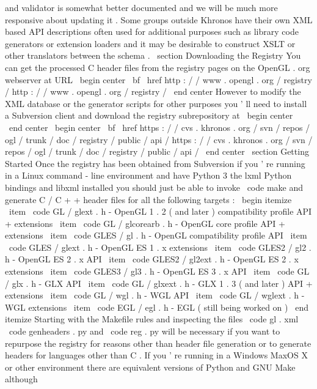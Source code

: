 and
validator
is
somewhat
better
documented
and
we
will
be
much
more
responsive
about
updating
it
.
Some
groups
outside
Khronos
have
their
own
XML
based
API
descriptions
often
used
for
additional
purposes
such
as
library
code
generators
or
extension
loaders
and
it
may
be
desirable
to
construct
XSLT
or
other
translators
between
the
schema
.
\
section
{
Downloading
the
Registry
}
You
can
get
the
processed
C
header
files
from
the
registry
pages
on
the
OpenGL
.
org
webserver
at
URL
\
begin
{
center
}
{
\
bf
\
href
{
http
:
/
/
www
.
opengl
.
org
/
registry
/
}
{
http
:
/
/
www
.
opengl
.
org
/
registry
/
}
}
\
end
{
center
}
However
to
modify
the
XML
database
or
the
generator
scripts
for
other
purposes
you
'
ll
need
to
install
a
Subversion
client
and
download
the
registry
subrepository
at
\
begin
{
center
}
\
end
{
center
}
\
begin
{
center
}
{
\
bf
\
href
{
https
:
/
/
cvs
.
khronos
.
org
/
svn
/
repos
/
ogl
/
trunk
/
doc
/
registry
/
public
/
api
/
}
{
https
:
/
/
cvs
.
khronos
.
org
/
svn
/
repos
/
ogl
/
trunk
/
doc
/
registry
/
public
/
api
/
}
}
\
end
{
center
}
\
section
{
Getting
Started
}
Once
the
registry
has
been
obtained
from
Subversion
if
you
'
re
running
in
a
Linux
command
-
line
environment
and
have
Python
3
the
lxml
Python
bindings
and
libxml
installed
you
should
just
be
able
to
invoke
\
code
{
make
}
and
generate
C
/
C
+
+
header
files
for
all
the
following
targets
:
\
begin
{
itemize
}
\
item
\
code
{
GL
/
glext
.
h
}
-
OpenGL
1
.
2
(
and
later
)
compatibility
profile
API
+
extensions
\
item
\
code
{
GL
/
glcorearb
.
h
}
-
OpenGL
core
profile
API
+
extensions
\
item
\
code
{
GLES
/
gl
.
h
}
-
OpenGL
compatibility
profile
API
\
item
\
code
{
GLES
/
glext
.
h
}
-
OpenGL
ES
1
.
x
extensions
\
item
\
code
{
GLES2
/
gl2
.
h
}
-
OpenGL
ES
2
.
x
API
\
item
\
code
{
GLES2
/
gl2ext
.
h
}
-
OpenGL
ES
2
.
x
extensions
\
item
\
code
{
GLES3
/
gl3
.
h
}
-
OpenGL
ES
3
.
x
API
\
item
\
code
{
GL
/
glx
.
h
}
-
GLX
API
\
item
\
code
{
GL
/
glxext
.
h
}
-
GLX
1
.
3
(
and
later
)
API
+
extensions
\
item
\
code
{
GL
/
wgl
.
h
}
-
WGL
API
\
item
\
code
{
GL
/
wglext
.
h
}
-
WGL
extensions
\
item
\
code
{
EGL
/
egl
.
h
}
-
EGL
(
still
being
worked
on
)
\
end
{
itemize
}
Starting
with
the
Makefile
rules
and
inspecting
the
files
\
code
{
gl
.
xml
}
\
code
{
genheaders
.
py
}
and
\
code
{
reg
.
py
}
will
be
necessary
if
you
want
to
repurpose
the
registry
for
reasons
other
than
header
file
generation
or
to
generate
headers
for
languages
other
than
C
.
If
you
'
re
running
in
a
Windows
MaxOS
X
or
other
environment
there
are
equivalent
versions
of
Python
and
GNU
Make
although
